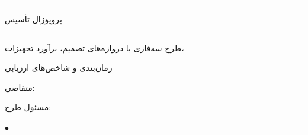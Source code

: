 \begin{titlepage}\centering
\vspace*{1.3cm}
{\color{accent}\rule{0.85\textwidth}{2pt}}\par\vspace{0.8cm}
{\Large پروپوزال تأسیس}\par\vspace{0.7cm}
{\Huge\bfseries\color{accent}\doctitle}\par\vspace{0.35cm}
{\color{accent}\rule{0.85\textwidth}{0.8pt}}\par\vspace{0.4cm}
{\large طرح سه‌فازی با دروازه‌های تصمیم، برآورد تجهیزات،}\par
{\large زمان‌بندی و شاخص‌های ارزیابی}\par\vspace{1.2cm}
{\large متقاضی: \orgname}\par\vspace{0.3cm}
{\large مسئول طرح: \projectlead}\par\vspace{0.3cm}
{\large \docversion \; $\bullet$ \; \docdate}\par
\end{titlepage}
